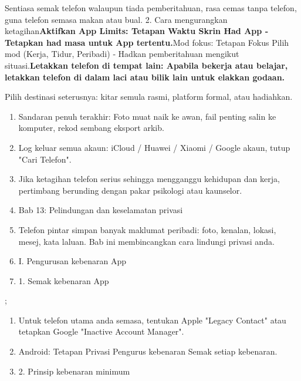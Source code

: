 \begin{tcbinfo}{Sentiasa semak telefon walaupun tiada pemberitahuan, rasa cemas tanpa telefon, guna telefon semasa makan atau bual.}
2. Cara mengurangkan ketagihan\textbf{Aktifkan App Limits: Tetapan Waktu Skrin Had App ‑ Tetapkan had masa untuk App tertentu.}Mod fokus: Tetapan Fokus Pilih mod (Kerja, Tidur, Peribadi) ‑ Hadkan pemberitahuan mengikut situasi.\textbf{Letakkan telefon di tempat lain: Apabila bekerja atau belajar, letakkan telefon di dalam laci atau bilik lain untuk elakkan godaan.}

\end{tcbinfo}

\begin{tcbpractice}{Pilih destinasi seterusnya: kitar semula rasmi, platform formal, atau hadiahkan.}
\begin{enumerate}
  \item Sandaran penuh terakhir: Foto muat naik ke awan, fail penting salin ke komputer, rekod sembang eksport arkib.
  \item Log keluar semua akaun: iCloud / Huawei / Xiaomi / Google akaun, tutup "Cari Telefon".
  \item Jika ketagihan telefon serius sehingga mengganggu kehidupan dan kerja, pertimbang berunding dengan pakar psikologi atau kaunselor.
  \item Bab 13: Pelindungan dan keselamatan privasi
  \item Telefon pintar simpan banyak maklumat peribadi: foto, kenalan, lokasi, mesej, kata laluan. Bab ini membincangkan cara lindungi privasi anda.
  \item I. Pengurusan kebenaran App
  \item 1. Semak kebenaran App
\end{enumerate}

\end{tcbpractice}

\begin{tcbpractice}{;}
\begin{enumerate}
  \item Untuk telefon utama anda semasa, tentukan Apple "Legacy Contact" atau tetapkan Google "Inactive Account Manager".
  \item Android: Tetapan Privasi Pengurus kebenaran Semak setiap kebenaran.
  \item 2. Prinsip kebenaran minimum
\end{enumerate}

\end{tcbpractice}
